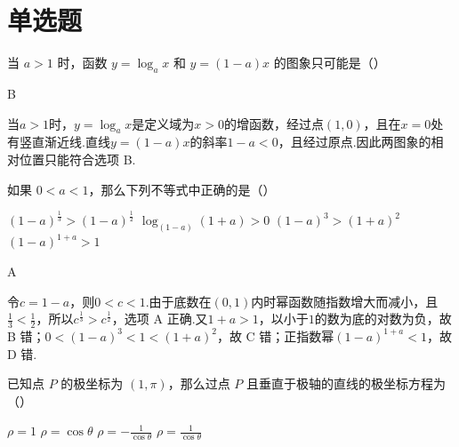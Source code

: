 \documentclass[UTF8,a4paper,oneside,11pt]{ctexbook}
\begin{document}
\section{单选题}

\begin{problem}
当 \(a > 1\) 时，函数 \(y = \log_a x\) 和 \(y = (1 - a)x\) 的图象只可能是（\quad）

\choices
    {}
    {}
    {}
    {}
\end{problem}

\begin{answer}
B
\end{answer}

\begin{solution}
当\(a>1\)时，\(y=\log_a x\)是定义域为\(x>0\)的增函数，经过点\((1,0)\)，且在\(x=0\)处有竖直渐近线.直线\(y=(1-a)x\)的斜率\(1-a<0\)，且经过原点.因此两图象的相对位置只能符合选项 B.
\end{solution}

\begin{problem}
如果 \(0 < a < 1\)，那么下列不等式中正确的是（\quad）

\choices
    {\((1 - a)^{\frac{1}{3}} > (1 - a)^{\frac{1}{2}}\)}
    {\(\log_{(1 - a)}(1 + a) > 0\)}
    {\((1 - a)^{3} > (1 + a)^{2}\)}
    {\((1 - a)^{1 + a} > 1\)}
\end{problem}

\begin{answer}
A
\end{answer}

\begin{solution}
令\(c=1-a\)，则\(0<c<1\).由于底数在\((0,1)\)内时幂函数随指数增大而减小，且\(\frac{1}{3}<\frac{1}{2}\)，所以\(c^{\frac{1}{3}}>c^{\frac{1}{2}}\)，选项 A 正确.又\(1+a>1\)，以小于\(1\)的数为底的对数为负，故 B 错；\(0<(1-a)^3<1<(1+a)^2\)，故 C 错；正指数幂\((1-a)^{1+a}<1\)，故 D 错.
\end{solution}

\begin{problem}
已知点 \(P\) 的极坐标为 \((1, \pi)\)，那么过点 \(P\) 且垂直于极轴的直线的极坐标方程为（\quad）

\choices
    {\(\rho = 1\)}
    {\(\rho = \cos \theta\)}
    {\(\rho = -\frac{1}{\cos\theta}\)}
    {\(\rho = \frac{1}{\cos\theta}\)}
\end{problem}
\end{document}
